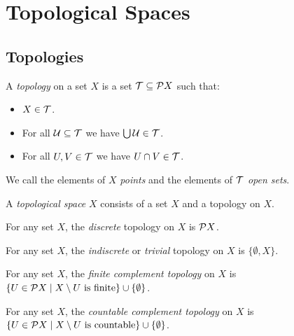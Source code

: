 \chapter{Topological Spaces}

\section{Topologies}
\begin{definition}[Topology]
    A \emph{topology} on a set $X$ is a set $\mathcal{T} \subseteq \mathcal{P} X$ such that:
    \begin{itemize}
        \item $X \in \mathcal{T}$.
        \item For all $\mathcal{U} \subseteq \mathcal{T}$ we have $\bigcup \mathcal{U} \in \mathcal{T}$.
        \item For all $U, V \in \mathcal{T}$ we have $U \cap V \in \mathcal{T}$.
    \end{itemize}
    We call the elements of $X$ \emph{points} and the elements of $\mathcal{T}$ \emph{open sets}.
\end{definition}

\begin{definition}
    A \emph{topological space} $X$ consists of a set $X$ and a topology on $X$.
\end{definition}

\begin{definition}
    For any set $X$, the \emph{discrete} topology on $X$ is $\mathcal{P} X$.
\end{definition}

\begin{definition}
    For any set $X$, the \emph{indiscrete} or \emph{trivial} topology on $X$ is $\{ \emptyset, X \}$.
\end{definition}

\begin{definition}
    For any set $X$, the \emph{finite complement topology} on $X$ is $\{ U \in \mathcal{P} X \mid X \setminus U \text{ is finite} \} 
    \cup \{ \emptyset \}$.
\end{definition}

\begin{definition}
    For any set $X$, the \emph{countable complement topology} on $X$ is $\{ U \in \mathcal{P} X \mid X \setminus U \text{ is countable} \} 
    \cup \{ \emptyset \}$.
\end{definition}


